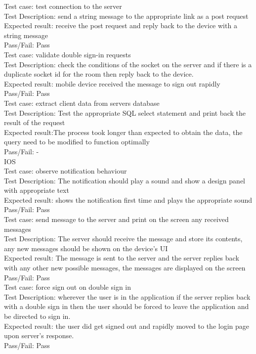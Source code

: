 \documentclass{article}
\begin{document}
\begin{enumerate}
	Test case: test connection to the server\\
	Test Description: send a string message to the appropriate link as a post request\\
	Expected result: receive the post request and reply back to the device with a string message\\
	Pass/Fail: Pass\\
	
	Test case: validate double sign-in requests\\
	Test Description: check the conditions of the socket on the server and if there is a duplicate socket id for the room then reply back to the device.\\
	Expected result: mobile device received the message to sign out rapidly\\
	Pass/Fail: Pass\\
	
	Test case: extract client data from servers database\\
	Test Description: Test the appropriate SQL select statement and print back the result of the request\\
	Expected result:The process took longer than expected to obtain the data, the query need to be modified to function optimally\\
	Pass/Fail: -\\
	
	IOS\\
	Test case: observe notification behaviour\\
	Test Description: The notification should play a sound and show a design panel with appropriate text\\
	Expected result: shows the notification first time and plays the appropriate sound\\
	Pass/Fail: Pass\\
	
	Test case: send message to the server and print on the screen any received messages\\
	Test Description: The server should receive the message and store its contents, any new messages should be shown on the device's UI\\
	Expected result: The message is sent to the server and the server replies back with any other new possible messages, the messages are displayed on the screen\\
	Pass/Fail: Pass\\
	
	Test case: force sign out on double sign in\\
	Test Description: wherever the user is in the application if the server replies back with a double sign in then the user should be forced to leave the application and be directed to sign in.\\
	Expected result: the user did get signed out and rapidly moved to the login page upon server's response.\\
	Pass/Fail: Pass\\
	

\end{enumerate}
\end{document}
